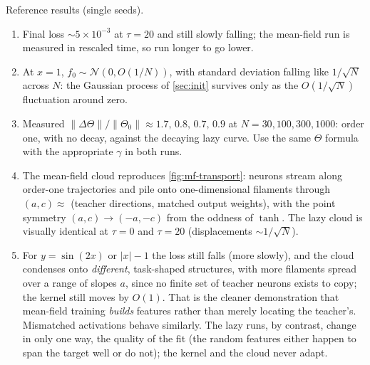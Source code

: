 \documentclass[11pt]{article}
\newcommand{\CN}{{\mathcal N}}
\begin{document}
\begin{solution}[ex:mf-lab]
Reference results (single seeds).
\begin{enumerate}
  \item Final loss $\sim5\times10^{-3}$ at $\tau=20$ and still slowly falling; the mean-field run is measured in rescaled time, so run longer to go lower.
  \item At $x=1$, $f_0\sim\CN(0,O(1/N))$, with standard deviation falling like $1/\sqrt N$ across $N$: the Gaussian process of \cref{sec:init} survives only as the $O(1/\sqrt N)$ fluctuation around zero.
  \item Measured $\|\Delta\Theta\|/\|\Theta_0\|\approx1.7,\,0.8,\,0.7,\,0.9$ at $N=30,100,300,1000$: order one, with no decay, against the decaying lazy curve. Use the same $\Theta$ formula with the appropriate $\gamma$ in both runs.
  \item The mean-field cloud reproduces \cref{fig:mf-transport}: neurons stream along order-one trajectories and pile onto one-dimensional filaments through $(a,c)\approx$ (teacher directions, matched output weights), with the point symmetry $(a,c)\to(-a,-c)$ from the oddness of $\tanh$. The lazy cloud is visually identical at $\tau=0$ and $\tau=20$ (displacements $\sim1/\sqrt N$).
  \item For $y=\sin(2x)$ or $|x|-1$ the loss still falls (more slowly), and the cloud condenses onto \emph{different}, task-shaped structures, with more filaments spread over a range of slopes $a$, since no finite set of teacher neurons exists to copy; the kernel still moves by $O(1)$. That is the cleaner demonstration that mean-field training \emph{builds} features rather than merely locating the teacher's. Mismatched activations behave similarly. The lazy runs, by contrast, change in only one way, the quality of the fit (the random features either happen to span the target well or do not); the kernel and the cloud never adapt.
\end{enumerate}
\end{solution}
\end{document}
